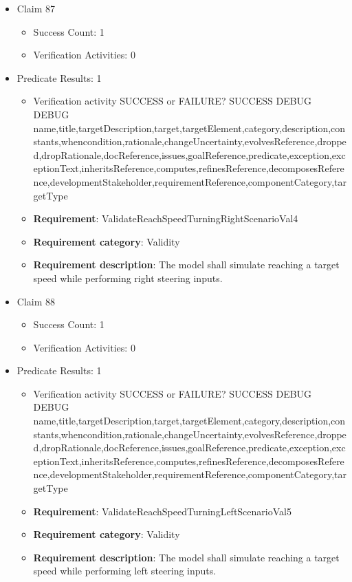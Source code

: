 \documentclass{article}
\begin{document}
\begin{itemize}
  				  \item Claim 87
				\begin{itemize}
			    	\item Success Count: 1 
			    	\item Verification Activities: 0
				\end{itemize}
				
									    
				\item Predicate Results: 1
					\begin{itemize}				
					\item Verification activity SUCCESS or FAILURE? SUCCESS
					DEBUG DEBUG name,title,targetDescription,target,targetElement,category,description,constants,whencondition,rationale,changeUncertainty,evolvesReference,dropped,dropRationale,docReference,issues,goalReference,predicate,exception,exceptionText,inheritsReference,computes,refinesReference,decomposesReference,developmentStakeholder,requirementReference,componentCategory,targetType
					\item \textbf{Requirement}: ValidateReachSpeedTurningRightScenarioVal4 
					\item \textbf{Requirement category}: Validity
					\item \textbf{Requirement description}: The model shall simulate reaching a target speed while performing right steering inputs.
					\end{itemize}

  				  \item Claim 88
				\begin{itemize}
			    	\item Success Count: 1 
			    	\item Verification Activities: 0
				\end{itemize}
				
									    
				\item Predicate Results: 1
					\begin{itemize}				
					\item Verification activity SUCCESS or FAILURE? SUCCESS
					DEBUG DEBUG name,title,targetDescription,target,targetElement,category,description,constants,whencondition,rationale,changeUncertainty,evolvesReference,dropped,dropRationale,docReference,issues,goalReference,predicate,exception,exceptionText,inheritsReference,computes,refinesReference,decomposesReference,developmentStakeholder,requirementReference,componentCategory,targetType
					\item \textbf{Requirement}: ValidateReachSpeedTurningLeftScenarioVal5 
					\item \textbf{Requirement category}: Validity
					\item \textbf{Requirement description}: The model shall simulate reaching a target speed while performing left steering inputs.
					\end{itemize}


\end{itemize}
\end{document}
